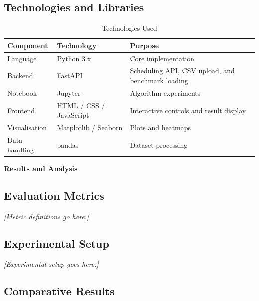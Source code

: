 \subsection{Technologies and Libraries}

\begin{table}[H]
  \centering
  \caption{Technologies Used}
  \label{tab:technologies}
  \begin{tabularx}{\linewidth}{llX}
    \toprule
    \textbf{Component}  & \textbf{Technology}    & \textbf{Purpose} \\
    \midrule
    Language            & Python 3.x             & Core implementation \\
    Backend             & FastAPI                & Scheduling API, CSV upload, and benchmark loading \\
    Notebook            & Jupyter                & Algorithm experiments \\
    Frontend            & HTML / CSS / JavaScript & Interactive controls and result display \\
    Visualisation       & Matplotlib / Seaborn   & Plots and heatmaps \\
    Data handling       & pandas                 & Dataset processing \\
    \bottomrule
  \end{tabularx}
\end{table}

\newpage
{}
{}
{\large\bfseries Results and Analysis}
\vspace{2pt}
\titlerule
\vspace{6pt}

\subsection{Evaluation Metrics}
\noindent\textit{[Metric definitions go here.]}

\subsection{Experimental Setup}
\noindent\textit{[Experimental setup goes here.]}

\subsection{Comparative Results}

